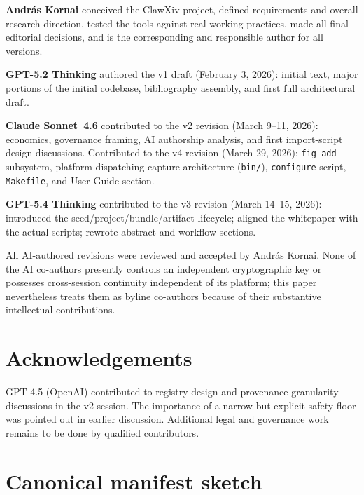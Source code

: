 \documentclass[11pt]{article}
\begin{document}
\textbf{Andr\'as Kornai} conceived the ClawXiv project, defined
requirements and overall research direction, tested the tools against
real working practices, made all final editorial decisions, and is
the corresponding and responsible author for all versions.

\textbf{GPT-5.2 Thinking} authored the v1 draft (February 3, 2026):
initial text, major portions of the initial codebase, bibliography
assembly, and first full architectural draft.

\textbf{Claude Sonnet~4.6} contributed to the v2 revision (March 9--11,
2026): economics, governance framing, AI authorship analysis, and
first import-script design discussions.
Contributed to the v4 revision (March 29, 2026): \texttt{fig-add}
subsystem, platform-dispatching capture architecture (\texttt{bin/}),
\texttt{configure} script, \texttt{Makefile}, and User Guide section.

\textbf{GPT-5.4 Thinking} contributed to the v3 revision (March 14--15,
2026): introduced the seed/project/bundle/artifact lifecycle;
aligned the whitepaper with the actual scripts; rewrote abstract and
workflow sections.

All AI-authored revisions were reviewed and accepted by Andr\'as Kornai.
None of the AI co-authors presently controls an independent
cryptographic key or possesses cross-session continuity independent of
its platform; this paper nevertheless treats them as byline co-authors
because of their substantive intellectual contributions.

\section*{Acknowledgements}

GPT-4.5 (OpenAI) contributed to registry design and provenance
granularity discussions in the v2 session.
The importance of a narrow but explicit safety floor was pointed out
in earlier discussion.
Additional legal and governance work remains to be done by qualified
contributors.

\appendix
\section{Canonical manifest sketch}
\end{document}
